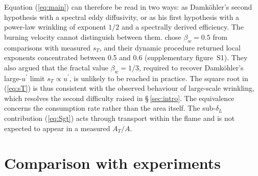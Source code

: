 \documentclass[lineno]{jfm}
\newcommand{\dL}{\delta_L}
\newcommand{\up}{u^{\prime}}
\begin{document}
Equation (\ref{eq:main}) can therefore be read in two ways: as Damk\"ohler's second hypothesis with a spectral eddy diffusivity, or as his first hypothesis with a power-law wrinkling of exponent $1/2$ and a spectrally derived efficiency. The burning velocity cannot distinguish between them. \citet{Charlette2002a} chose $\beta_w = 0.5$ from comparisons with measured $s_T$, and their dynamic procedure \citep{Charlette2002b} returned local exponents concentrated between 0.5 and 0.6 (supplementary figure~S1). They also argued that the fractal value $\beta_w = 1/3$, required to recover Damk\"ohler's large-$\up$ limit $s_T \propto \up$, is unlikely to be reached in practice. The square root in (\ref{eq:sT}) is thus consistent with the observed behaviour of large-scale wrinkling, which resolves the second difficulty raised in \S\,\ref{sec:intro}. The equivalence concerns the consumption rate rather than the area itself. The sub-$\dL$ contribution (\ref{eq:Sgt}) acts through transport within the flame \citep{Nivarti2019} and is not expected to appear in a measured $A_T / A$.

\section{Comparison with experiments}\label{sec:comparison}
\end{document}
